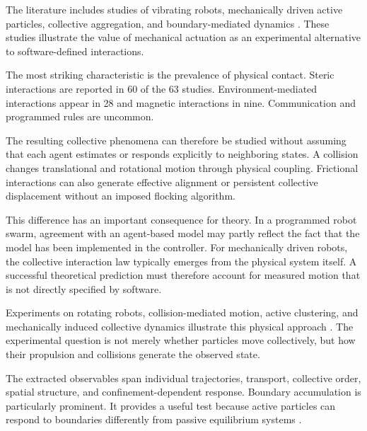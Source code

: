 The literature includes studies of vibrating
robots, mechanically driven active particles,
collective aggregation, and boundary-mediated
dynamics
\cite{Welch2018aggregatesuppressio,Welch2019activereorientation,Deblais2019howtoforceanarmy,Xi2024beamsbotsandbey,Balda2022playingwithactive,Xi2024emergentintelligenc,Mohanty2025multimodalmotionan,GuzmnLastra2026emergenceofbeating,Edwards2026robusttopologically,Musacchio2026activeembracemente,Hoek2026pistonlikeinformat,Smith2026fromswarmtoindivi}.
These studies illustrate the value of
mechanical actuation as an experimental
alternative to software-defined interactions.

The most striking characteristic is the
prevalence of physical contact. Steric
interactions are reported in 60 of the
63 studies. Environment-mediated
interactions appear in 28 and magnetic
interactions in nine. Communication and
programmed rules are uncommon.

The resulting collective phenomena can
therefore be studied without assuming
that each agent estimates or responds
explicitly to neighboring states.
A collision changes translational and
rotational motion through physical
coupling. Frictional interactions can
also generate effective alignment
or persistent collective displacement
without an imposed flocking algorithm.

This difference has an important
consequence for theory. In a programmed
robot swarm, agreement with an
agent-based model may partly reflect
the fact that the model has been
implemented in the controller.
For mechanically driven robots,
the collective interaction law
typically emerges from the physical
system itself. A successful theoretical
prediction must therefore account
for measured motion that is not
directly specified by software.

Experiments on rotating robots,
collision-mediated motion,
active clustering, and mechanically
induced collective dynamics
illustrate this physical approach
\cite{Scholz2018rotatingrobotsmove,Arbel2025amechanicalroutef,Antonov2025selfsustainedfrict,Baconnier2022selectiveandcollec,Boudet2025nonmarkoviandynami,MuozObreque2026dynamicsofmagnetic,Novkoski2026graspionanopenso,Xi2024emergentbehaviorso,Casiulis2025ageometricconditio,Tian2018flowratebehavioran,Rozenblit2020diffusivedynamicsa,Porvatov2021optimizingselfrota}.
The experimental question is not
merely whether particles move
collectively, but how their
propulsion and collisions generate
the observed state.

The extracted observables span
individual trajectories, transport,
collective order, spatial structure,
and confinement-dependent response.
Boundary accumulation is particularly
prominent. It provides a useful
test because active particles can
respond to boundaries differently
from passive equilibrium systems
\cite{Bechinger2016active}.

